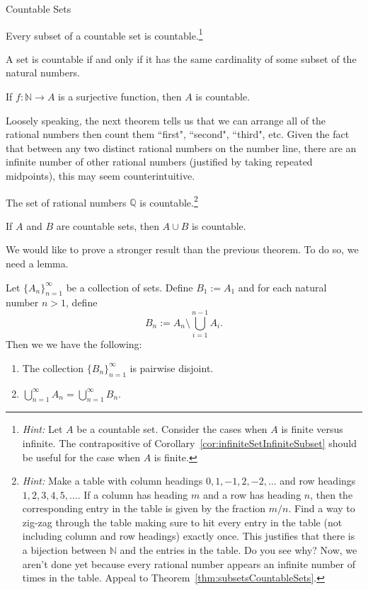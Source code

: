 \begin{section}{Countable Sets}
\begin{theorem}\label{thm:subsetsCountableSets}
Every subset of a countable set is countable.\footnote{\emph{Hint:} Let $A$ be a countable set.  Consider the cases when $A$ is finite versus infinite. The contrapositive of Corollary~\ref{cor:infiniteSetInfiniteSubset} should be useful for the case when $A$ is finite.}
\end{theorem}

\begin{theorem}
A set is countable if and only if it has the same cardinality of some subset of the natural numbers.
\end{theorem}

\begin{theorem}
If $f:\mathbb{N}\to A$ is a surjective function, then $A$ is countable.
\end{theorem}

Loosely speaking, the next theorem tells us that we can arrange all of the rational numbers then count them ``first", ``second", ``third", etc. Given the fact that between any two distinct rational numbers on the number line, there are an infinite number of other rational numbers (justified by taking repeated midpoints), this may seem counterintuitive.  

\begin{theorem}
The set of rational numbers $\mathbb{Q}$ is countable.\footnote{\emph{Hint:} Make a table with column headings $0, 1, -1, 2,-2,\ldots$ and row headings $1,2,3,4,5,\ldots$.  If a column has heading $m$ and a row has heading $n$, then the corresponding entry in the table is given by the fraction $m/n$.  Find a way to zig-zag through the table making sure to hit every entry in the table (not including column and row headings) exactly once.  This justifies that there is a bijection between $\mathbb{N}$ and the entries in the table.  Do you see why?  Now, we aren't done yet because every rational number appears an infinite number of times in the table. Appeal to Theorem~\ref{thm:subsetsCountableSets}.}
\end{theorem}

\begin{theorem}\label{thm:union of countable sets}
If $A$ and $B$ are countable sets, then $A\cup B$ is countable.
\end{theorem}

We would like to prove a stronger result than the previous theorem. To do so, we need a lemma. 

\begin{lemma}\label{lem:retool infinite collection}
Let $\{A_n\}_{n=1}^{\infty}$ be a collection of sets. Define $B_1:=A_1$ and for each natural number $n>1$, define
\[
B_n:=A_n\setminus \bigcup_{i=1}^{n-1}A_i.
\]
Then we we have the following:
\begin{enumerate}[label=\textrm{(\alph*)}]
\item The collection $\{B_n\}_{n=1}^{\infty}$ is pairwise disjoint.
\item $\displaystyle \bigcup_{n=1}^{\infty}A_n =\bigcup_{n=1}^{\infty}B_n$.
\end{enumerate}
\end{lemma}


\end{section}
